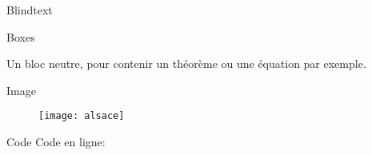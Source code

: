 


\frame[plain]{\titlepage} 

\begin{frame}{Blindtext}
\blindtext
\end{frame}

\begin{frame}[allowframebreaks]{Boxes}
\begin{Information}
	\blindtext
\end{Information}

\begin{Question}
	\blindtext
\end{Question}

\begin{Warning}
	\blindtext
\end{Warning}

\begin{Error}
	\blindtext
\end{Error}

\begin{Information}
	\blindtext
\end{Information}

\begin{Neutral}
	Un bloc neutre, pour contenir un théorème ou une équation par exemple.
\end{Neutral}
\end{frame}

\begin{frame}{Image}
\begin{figure}[htbp]
\centering
\texttt{[image: alsace]}
\end{figure}
\end{frame}

\begin{frame}{Code}
Code en ligne: 
\end{frame}
